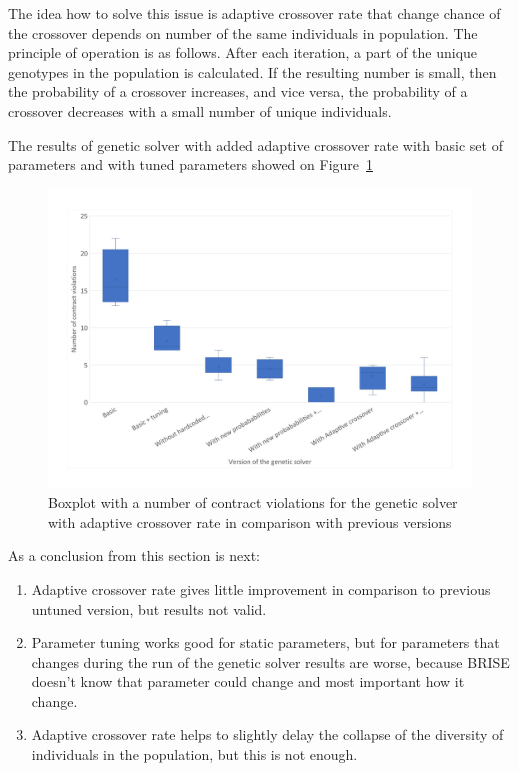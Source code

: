 The idea how to solve this issue is adaptive crossover rate that change chance of the crossover depends on number of the same individuals in population. 
The principle of operation is as follows. After each iteration, a part of the unique genotypes in the population is calculated. If the resulting number is small, then the probability of a crossover increases, and vice versa, the probability of a crossover decreases with a small number of unique individuals.

The results of genetic solver with added adaptive crossover rate with basic set of parameters and with tuned parameters showed on Figure~\ref{fig:boxplotsolverAdaptiveCrossoverTuning}
\begin{figure}
	\centering
	\includegraphics[width=\textwidth]{images/BoxPlotSolverAdaptiveCrossoverTuning.pdf}
	\caption[Boxplot with a number of contract violations for the genetic solver with adaptive crossover rate in comparison with previous versions]{Boxplot with a number of contract violations for the genetic solver with adaptive crossover rate in comparison with previous versions}
	\label{fig:boxplotsolverAdaptiveCrossoverTuning}
\end{figure}

As a conclusion from this section is next:
\begin{enumerate}
	\item Adaptive crossover rate gives little improvement in comparison to previous untuned version, but results not valid.
	\item Parameter tuning works good for static parameters, but for parameters that changes during the run of the genetic solver results are worse, because BRISE doesn't know that parameter could change and most important how it change.
	\item Adaptive crossover rate helps to slightly delay the collapse of the diversity of individuals in the population, but this is not enough.
\end{enumerate}                         


